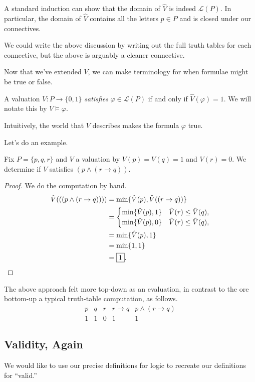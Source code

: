 \documentclass[../notes.tex]{subfiles}
\begin{document}
A standard induction can show that the domain of $\hat V$ is indeed $\mathcal L(P)$. In particular, the domain of $\hat V$ contains all the letters $p\in P$ and is closed under our connectives.
\begin{remark}
	We could write the above discussion by writing out the full truth tables for each connective, but the above is arguably a cleaner connective.
\end{remark}
Now that we've extended $V$, we can make terminology for when formulae might be true or false.
\begin{definition}[Satisfies]
	A valuation $V:P\to\{0,1\}$ \textit{satisfies} $\varphi\in\mathcal L(P)$ if and only if $\hat V(\varphi)=1$. We will notate this by $V\models\varphi$.
\end{definition}
Intuitively, the world that $V$ describes makes the formula $\varphi$ true.

Let's do an example.
\begin{exe}
	Fix $P=\{p,q,r\}$ and $V$ a valuation by $V(p)=V(q)=1$ and $V(r)=0$. We determine if $V$ satisfies $(p\land(r\to q))$.
\end{exe}
\begin{proof}
	We do the computation by hand.
	\begin{align*}
		\hat V(((p\land(r\to q)))) &= \min\{\hat V(p),\hat V((r\to q))\} \\
		&= \begin{cases}
			\min\{\hat V(p),1\} & \hat V(r)\le\hat V(q), \\
			\min\{\hat V(p),0\} & \hat V(r)\le\hat V(q), \\
		\end{cases} \\
		&= \min\{\hat V(p),1\} \\
		&= \min\{1,1\} \\
		&= \boxed1.\qedhere
	\end{align*}
\end{proof}
The above approach felt more top-down as an evaluation, in contrast to the ore bottom-up a typical truth-table computation, as follows.
\[\begin{array}{c|c|c||c|c}
	p & q & r & r\to q & p\land(r\to q) \\\hline
	1 & 1 & 0 & 1 & 1
\end{array}\]

\subsection{Validity, Again}
We would like to use our precise definitions for logic to recreate our definitions for ``valid.''
\end{document}
